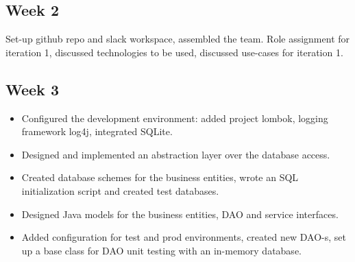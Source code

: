 \documentclass[12pt]{article}
\begin{document}
\maketitle

\subsection*{Week 2}
Set-up github repo and slack workspace, assembled the team. Role assignment for iteration 1, discussed technologies to be used, discussed use-cases for iteration 1.


\subsection*{Week 3}
\begin{itemize}
\item Configured the development environment: added project lombok, logging framework log4j, integrated SQLite. 

\item Designed and implemented an abstraction layer over the database access. 

\item Created database schemes for the business entities, wrote an SQL initialization script and created test databases. 

\item Designed Java models for the business entities, DAO and service interfaces. 

\item Added configuration for test and prod environments, created new DAO-s, set up a base class for DAO unit testing with an in-memory database. 


\end{itemize}
\end{document}
